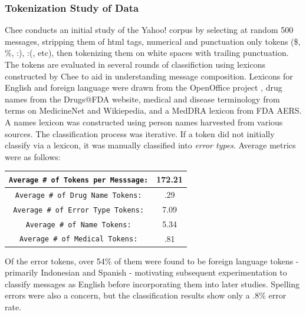 \documentclass[twoside,11pt]{article}
\begin{document}
\subsubsection{Tokenization Study of Data}
Chee conducts an initial study of the Yahoo! corpus by selecting at random 500 messages, stripping them of html tags, numerical and punctuation only tokens (\$, \%, :), :(, etc), then tokenizing them on white spaces with trailing punctuation. The tokens are evaluated in several rounds of classifiction using lexicons constructed by Chee to aid in understanding message composition. Lexicons for English and foreign language were drawn from the OpenOffice project \citep{OpenOffice}, drug names from the Drugs@FDA website, medical and disease terminology from terms on MedicineNet and Wikiepedia, and a MedDRA lexicon from FDA AERS. A names lexicon was constructed using person names harvested from various sources. The classification process was iterative. If a token did not initially classify via a lexicon, it was manually classified into \textit{error types}. Average metrics were as follows:
\begin{center}
  \begin{tabular}{||c|c||}
    \hline
    \verb|Average # of Tokens per Messsage:| & 172.21\\
    \hline
    \verb|Average # of Drug Name Tokens:| & .29\\
    \hline
    \verb|Average # of Error Type Tokens:| & 7.09\\
    \hline
    \verb|Average # of Name Tokens:| & 5.34\\
    \hline
    \verb|Average # of Medical Tokens:| & .81\\
    \hline
  \end{tabular}
\end{center}
Of the error tokens, over 54\% of them were found to be foreign language tokens - primarily Indonesian and Spanish - motivating subsequent experimentation to classify messages as English before incorporating them into later studies. Spelling errors were also a concern, but the classification results show only a $.8\%$ error rate. %
\end{document}

